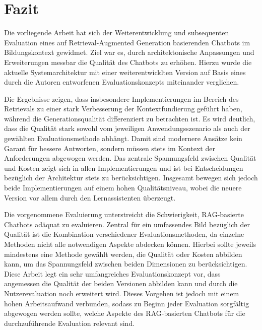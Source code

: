 \chapter{Fazit}
\label{sec:fazit}

Die vorliegende Arbeit hat sich der Weiterentwicklung und subsequenten Evaluation eines auf Retrieval-Augmented Generation basierenden Chatbots im Bildungskontext gewidmet.
Ziel war es, durch architektonische Anpassungen und Erweiterungen messbar die Qualität des Chatbots zu erhöhen.
Hierzu wurde die aktuelle Systemarchitektur mit einer weiterentwicklten Version auf Basis eines durch die Autoren entworfenen Evaluationskonzepts miteinander verglichen.

Die Ergebnisse zeigen, dass insbesondere Implementierungen im Bereich des Retrievals zu einer stark Verbesserung der Kontextfundierung geführt haben, während die Generationsqualität differenziert zu betrachten ist.
Es wird deutlich, dass die Qualität stark sowohl vom jeweiligen Anwendungsszenario als auch der gewählten Evaluationsmethode abhängt.
Damit sind modernere Ansätze kein Garant für bessere Antworten, sondern müssen stets im Kontext der Anforderungen abgewogen werden.
Das zentrale Spannungsfeld zwischen Qualität und Kosten zeigt sich in allen Implementierungen und ist bei Entscheidungen bezüglich der Architektur stets zu berücksichtigen.
Insgesamt bewegen sich jedoch beide Implementierungen auf einem hohen Qualitätsniveau, wobei die neuere Version vor allem durch den Lernassistenten überzeugt.

Die vorgenommene Evaluierung unterstreicht die Schwierigkeit, RAG-basierte Chatbots adäquat zu evaluieren.
Zentral für ein umfassendes Bild bezüglich der Qualität ist die Kombination verschiedener Evaluationsmethoden, da einzelne Methoden nicht alle notwendigen Aspekte abdecken können.
Hierbei sollte jeweils mindestens eine Methode gewählt werden, die Qualität oder Kosten abbilden kann, um das Spannungsfeld zwischen beiden Dimensionen zu berücksichtigen.
Diese Arbeit legt ein sehr umfangreiches Evaluationskonzept vor, dass angemessen die Qualität der beiden Versionen abbilden kann und durch die Nutzerevaluation noch erweitert wird.
Dieses Vorgehen ist jedoch mit einem hohen Arbeitsaufwand verbunden, sodass zu Beginn jeder Evaluation sorgfältig abgewogen werden sollte, welche Aspekte des RAG-basierten Chatbots für die durchzuführende Evaluation relevant sind.

